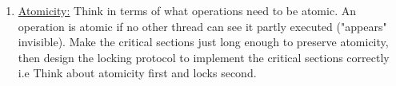 \documentclass[8pt]{extreport}
\begin{document}
\begin{enumerate}
\item \underline{Atomicity:} Think in terms of what operations need to be atomic. An operation is atomic if no other thread can see it partly executed ("appears" invisible). Make the critical sections just long enough to preserve atomicity, then design the locking protocol to implement the critical sections correctly i.e Think about atomicity first and locks second.
\end{enumerate}
\end{document}
